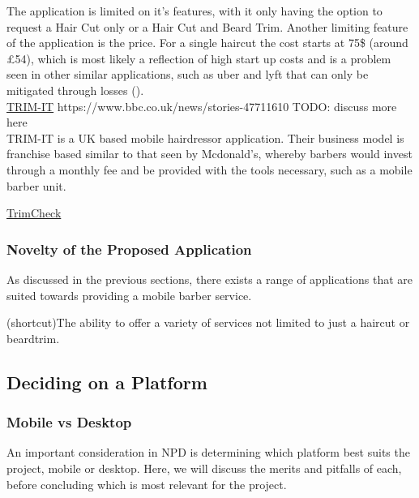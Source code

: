 \documentclass[12pt]{article}
\begin{document}
	The application is limited on it's features, with it only having the option to request a Hair Cut only or a Hair Cut and Beard Trim. 
	Another limiting feature of the application is the price. For a single haircut the cost starts at 75\$ (around £54), which is most likely a reflection of high start up costs and is a problem seen in other similar applications, such as uber and lyft that can only be mitigated through losses (\cite{WillRidehailingProfits}).
	\\
	
	\noindent
	\underline{TRIM-IT}
	https://www.bbc.co.uk/news/stories-47711610
	TODO: discuss more here
	\\
	TRIM-IT is a UK based mobile hairdressor application. Their business model is franchise based similar to that seen by Mcdonald's, whereby barbers would invest through a monthly fee and be provided with the tools necessary, such as a mobile barber unit. 
	
	\noindent
	\underline{TrimCheck}
	
	
	\subsubsection{Novelty of the Proposed Application}
	As discussed in the previous sections, there exists a range of applications that are suited towards providing a mobile barber service.
	
	(shortcut)The ability to offer a variety of services not limited to just a haircut or beardtrim.
	
	\subsection{Deciding on a Platform}
	\label{chap:platform}
	\subsubsection{Mobile vs Desktop}
	An important consideration in NPD is determining which platform best suits the project, mobile or desktop. Here, we will discuss the merits and pitfalls of each, before concluding which is most relevant for the project. 
	\\
	
\end{document}
